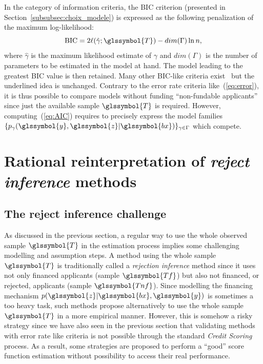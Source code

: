 In the category of information criteria, the BIC criterion (presented in Section~\ref{subsubsec:choix_modele}) is expressed as the following penalization of the maximum log-likelihood:
\begin{equation}\label{eq:AIC}
\mbox{BIC} = 2 \ell(\hat\gamma;\glssymbol{T}) - dim(\Gamma) \ln n,
\end{equation}
where $\hat\gamma$ is the maximum likelihood estimate of $\gamma$ and $dim(\Gamma)$ is the number of parameters to be estimated in the model at hand. The model leading to the greatest BIC value is then retained. Many other BIC-like criteria exist~\cite{vandewalle:tel-00447141} but the underlined idea is unchanged. Contrary to the error rate criteria like~(\ref{eq:error}), it is thus possible to compare models without funding ``non-fundable applicants'' since just the available sample $\glssymbol{T}$ is required. However, computing~(\ref{eq:AIC}) requires to precisely express the model families $\{p_{\gamma}(\glssymbol{y},\glssymbol{z}|\glssymbol{bx})\}_{\gamma \in \Gamma}$ which compete.

\section{Rational reinterpretation of \textit{reject inference} methods} \label{sec:methods_reject}

\subsection{The reject inference challenge} \label{subsec:challenge}

As discussed in the previous section, a regular way to use the whole observed sample $\glssymbol{T}$ in the estimation process implies some challenging modelling and assumption steps. A method using the whole sample $\glssymbol{T}$ is traditionally called a {\it rejection inference} method since it uses not only financed applicants (sample $\glssymbol{Tf}$) but also not financed, or rejected, applicants (sample $\glssymbol{Tnf}$).
Since modelling the financing mechanism $p(\glssymbol{z} | \glssymbol{bx}, \glssymbol{y})$ is sometimes a too heavy task, such methods propose alternatively to use the whole sample $\glssymbol{T}$ in a more empirical manner. However, this is somehow a risky strategy since we have also seen in the previous section that validating methods with error rate like criteria is not possible through the standard \textit{Credit Scoring} process. As a result, some strategies are proposed to perform a ``good'' \gls{score} function estimation without possibility to access their real performance.

